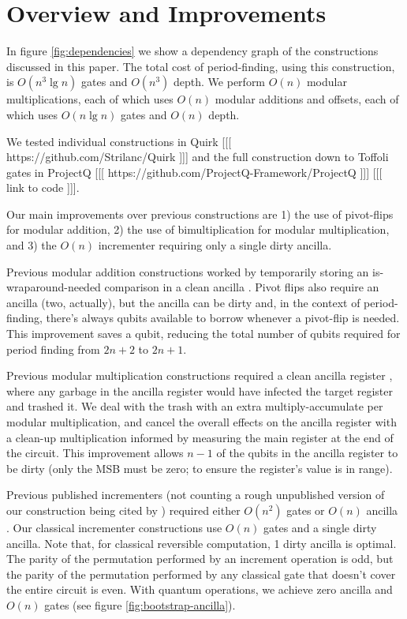 \documentclass[twocolumn]{article}
\begin{document}
\section{Overview and Improvements} \label{sec:costs}

In figure \ref{fig:dependencies} we show a dependency graph of the constructions discussed in this paper.
The total cost of period-finding, using this construction, is $O(n^3 \lg n)$ gates and $O(n^3)$ depth.
We perform $O(n)$ modular multiplications, each of which uses $O(n)$ modular additions and offsets, each of which uses $O(n \lg n)$ gates \cite{haner2016} and $O(n)$ depth.

We tested individual constructions in Quirk [[[ https://github.com/Strilanc/Quirk ]]] and the full construction down to Toffoli gates in ProjectQ [[[ https://github.com/ProjectQ-Framework/ProjectQ ]]] [[[ link to code ]]].

Our main improvements over previous constructions are 1) the use of pivot-flips for modular addition, 2) the use of bimultiplication for modular multiplication, and 3) the $O(n)$ incrementer requiring only a single dirty ancilla.

Previous modular addition constructions worked by temporarily storing an is-wraparound-needed comparison in a clean ancilla \cite{takahashi2006, haner2016}.
Pivot flips also require an ancilla (two, actually), but the ancilla can be dirty and, in the context of period-finding, there's always qubits available to borrow whenever a pivot-flip is needed.
This improvement saves a qubit, reducing the total number of qubits required for period finding from $2n+2$ to $2n+1$.

Previous modular multiplication constructions required a clean ancilla register \cite{haner2016}, where any garbage in the ancilla register would have infected the target register and trashed it.
We deal with the trash with an extra multiply-accumulate per modular multiplication, and cancel the overall effects on the ancilla register with a clean-up multiplication informed by measuring the main register at the end of the circuit.
This improvement allows $n-1$ of the qubits in the ancilla register  to be dirty (only the MSB must be zero; to ensure the register's value is in range).

Previous published incrementers (not counting a rough unpublished version of our construction \cite{gidney2015} being cited by \cite{haner2016}) required either $O(n^2)$ gates or $O(n)$ ancilla \cite{draper2000, barenco1995}.
Our classical incrementer constructions use $O(n)$ gates and a single dirty ancilla.
Note that, for classical reversible computation, 1 dirty ancilla is optimal.
The parity of the permutation performed by an increment operation is odd, but the parity of the permutation performed by any classical gate that doesn't cover the entire circuit is even.
With quantum operations, we achieve zero ancilla and $O(n)$ gates (see figure \ref{fig:bootstrap-ancilla}).
\end{document}
